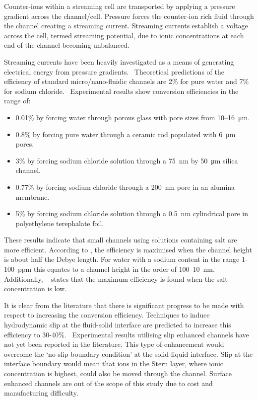 \documentclass[10pt,final,journal]{IEEEtran}
\begin{document}
    Counter-ions within a streaming cell are transported by applying a pressure gradient across the channel/cell.
    Pressure forces the counter-ion rich fluid through the channel creating a streaming current.
    Streaming currents establish a voltage across the cell, termed streaming potential, due to ionic concentrations at each end of the channel becoming unbalanced.

    Streaming currents have been heavily investigated as a means of generating electrical energy from pressure gradients.~\cite{Chang2009,Daiguji2006,Daiguji2004b,Davidson2008a,Davidson2008,CherngHon2012,Jiao2014,Lu2006,Olthuis2005,Osterle1964,Pennathur2007,Ren2008a,VanderHeyden2006,Heyden2007,Xie2008,Yang2003}
    Theoretical predictions of the efficiency of standard micro/nano-fluidic channels are 2\% for pure water and 7\% for sodium chloride.~\cite{VanderHeyden2006}
    Experimental results show conversion efficiencies in the range of:
    \begin{itemize}
        \item 0.01\% by forcing water through porous glass with pore sizes from 10\thinspace--\SI{16}{\micro\metre}.~\cite{Yang2003}
        \item 0.8\% by forcing pure water through a ceramic rod populated with \SI{6}{\micro\metre} pores.~\cite{Yang2004}
        \item 3\% by forcing sodium chloride solution through a \SI{75}{\nano\metre} by \SI{50}{\micro\metre} silica channel.~\cite{Heyden2007}
        \item 0.77\% by forcing sodium chloride through a \SI{200}{\nano\metre} pore in an alumina membrane.~\cite{Lu2006}
        \item 5\% by forcing sodium chloride solution through a \SI{0.5}{\nano\metre} cylindrical pore in polyethylene terephalate foil.~\cite{Xie2008}
    \end{itemize}
    These results indicate that small channels using solutions containing salt are more efficient.
    According to \cite{Daiguji2004b}, the efficiency is maximised when the channel height is about half the Debye length.
    For water with a sodium content in the range 1--100~ppm this equates to a channel height in the order of 100--10~nm.
    Additionally, ~\cite{VanderHeyden2006} states that the maximum efficiency is found when the salt concentration is low.


    It is clear from the literature that there is significant progress to be made with respect to increasing the conversion efficiency.
    Techniques to induce hydrodynamic slip at the fluid-solid interface are predicted to increase this efficiency to 30-40\%.~\cite{Davidson2008a, Ren2008a}
    Experimental results utilising slip enhanced channels have not yet been reported in the literature.
    This type of enhancement would overcome the `no-slip boundary condition' at the solid-liquid interface.
    Slip at the interface boundary would mean that ions in the Stern layer, where ionic concentration is highest, could also be moved through the channel.
    Surface enhanced channels are out of the scope of this study due to cost and manufacturing difficulty.
\end{document}
